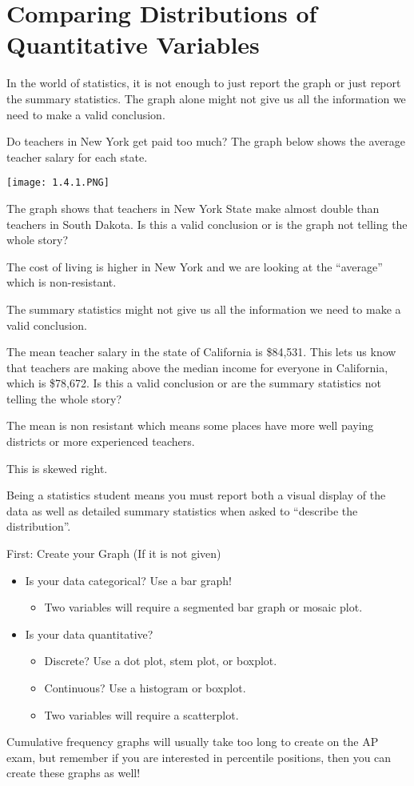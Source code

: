\documentclass[../stats.tex]{subfiles}
\begin{document}
\section{Comparing Distributions of Quantitative Variables}
In the world of statistics, it is not enough to just report the graph or just report the summary statistics. The graph alone might not give us all the information we need to make a valid conclusion.
\begin{example}
    Do teachers in New York get paid too much? The graph below shows the average teacher salary for each state.
    \begin{center}
        \texttt{[image: 1.4.1.PNG]}
    \end{center}
    The graph shows that teachers in New York State make almost double than teachers in South Dakota. Is this a valid conclusion or is the graph not telling the whole story?

    The cost of living is higher in New York and we are looking at the ``average'' which is non-resistant.

    The summary statistics might not give us all the information we need to make a valid conclusion.
\end{example}

\begin{example}
    The mean teacher salary in the state of California is \$84,531. This lets us know that teachers are making above the median income for everyone in California, which is \$78,672. Is this a valid conclusion or are the summary statistics
    not telling the whole story?

    The mean is non resistant which means some places have more well paying districts or more experienced teachers.

    This is skewed right.
\end{example}

Being a statistics student means you must report both a visual display of the data as well as detailed summary statistics when asked to ``describe the distribution''.

First: Create your Graph (If it is not given)
\begin{itemize}
    \item Is your data categorical? Use a bar graph! 
    \begin{itemize}
        \item Two variables will require a segmented bar graph or mosaic plot.
    \end{itemize}
    \item Is your data quantitative?
    \begin{itemize}
        \item Discrete? Use a dot plot, stem plot, or boxplot.
        \item Continuous? Use a histogram or boxplot.
        \item Two variables will require a scatterplot.
    \end{itemize}
\end{itemize}
Cumulative frequency graphs will usually take too long to create on the AP exam, but remember if you are interested in percentile positions, then you can create these graphs as well!
\end{document}
